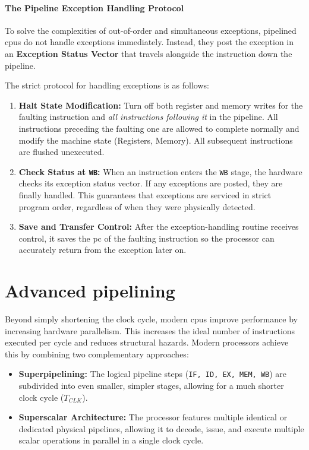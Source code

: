 \paragraph{The Pipeline Exception Handling Protocol}
To solve the complexities of out-of-order and simultaneous exceptions, pipelined \glspl{cpu} do not handle exceptions immediately. Instead, they post the exception in an \textbf{Exception Status Vector} that travels alongside the instruction down the pipeline. 

The strict protocol for handling exceptions is as follows:
\begin{enumerate}
    \item \textbf{Halt State Modification:} Turn off both register and memory writes for the faulting instruction and \textit{all instructions following it} in the pipeline. All instructions preceding the faulting one are allowed to complete normally and modify the machine state (Registers, Memory). All subsequent instructions are flushed unexecuted.
    \item \textbf{Check Status at \texttt{WB}:} When an instruction enters the \texttt{WB} stage, the hardware checks its exception status vector. If any exceptions are posted, they are finally handled. This guarantees that exceptions are serviced in strict program order, regardless of when they were physically detected.
    \item \textbf{Save and Transfer Control:} After the exception-handling routine receives control, it saves the \gls{pc} of the faulting instruction so the processor can accurately return from the exception later on.
\end{enumerate}

\section{Advanced pipelining}
Beyond simply shortening the clock cycle, modern \glspl{cpu} improve performance by increasing hardware parallelism. This increases the ideal number of instructions executed per cycle and reduces structural hazards. Modern processors achieve this by combining two complementary approaches:

\begin{itemize}
    \item \textbf{Superpipelining:} The logical pipeline steps (\texttt{IF, ID, EX, MEM, WB}) are subdivided into even smaller, simpler stages, allowing for a much shorter clock cycle ($T_{CLK}$).
    \item \textbf{Superscalar Architecture:} The processor features multiple identical or dedicated physical pipelines, allowing it to decode, issue, and execute multiple scalar operations in parallel in a single clock cycle.
\end{itemize}


